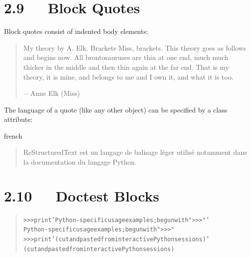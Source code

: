\documentclass[a4paper]{memoir}
\begin{document}
\section{2.9   Block Quotes%
  \label{block-quotes}%
}

Block quotes consist of indented body elements:

\begin{quote}
My theory by A. Elk.  Brackets Miss, brackets.  This theory goes
as follows and begins now.  All brontosauruses are thin at one
end, much much thicker in the middle and then thin again at the
far end.  That is my theory, it is mine, and belongs to me and I
own it, and what it is too.
\nopagebreak

\raggedleft —Anne Elk (Miss)
\end{quote}

The language of a quote (like any other object) can be specified by
a class attribute:

% 

\begin{selectlanguage}{french}
\begin{quote}
ReStructuredText est un langage de balisage léger utilisé
notamment dans la documentation du langage Python.
\end{quote}
\end{selectlanguage}


\section{2.10   Doctest Blocks%
  \label{doctest-blocks}%
}

\begin{quote}
\begin{alltt}
>>> print 'Python-specific usage examples; begun with ">>>"'
Python-specific usage examples; begun with ">>>"
>>> print '(cut and pasted from interactive Python sessions)'
(cut and pasted from interactive Python sessions)
\end{alltt}
\end{quote}
\end{document}
